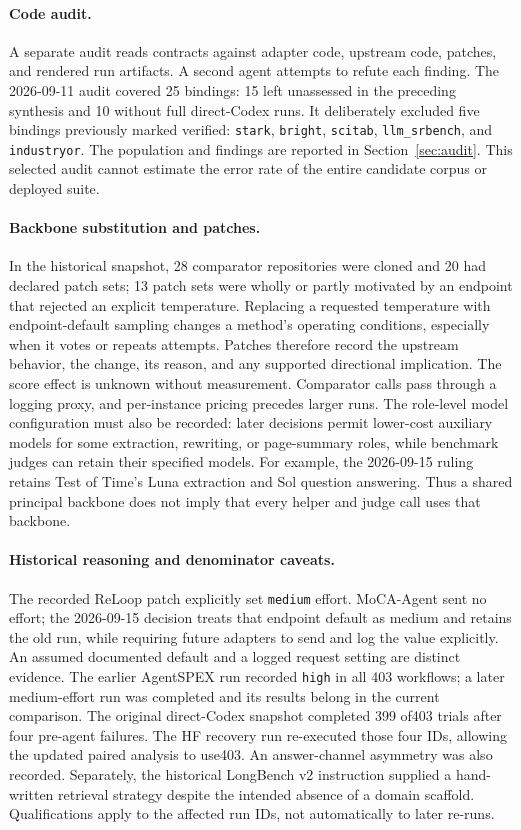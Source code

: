 \paragraph{Code audit.}
A separate audit reads contracts against adapter code, upstream code, patches, and rendered
run artifacts. A second agent attempts to refute each finding. The 2026-09-11 audit covered
25 bindings: 15 left unassessed in the preceding synthesis and 10 without full direct-Codex
runs. It deliberately excluded five bindings previously marked verified:
\texttt{stark}, \texttt{bright}, \texttt{scitab}, \texttt{llm\_srbench}, and \texttt{industryor}.
The population and findings are reported in Section~\ref{sec:audit}. This selected audit
cannot estimate the error rate of the entire candidate corpus or deployed suite.

\paragraph{Backbone substitution and patches.}
In the historical snapshot, 28 comparator repositories were cloned and 20 had declared patch
sets; 13 patch sets were wholly or partly motivated by an endpoint that rejected an explicit
temperature. Replacing a requested temperature with endpoint-default sampling changes a method's
operating conditions, especially when it votes or repeats attempts. Patches therefore record
the upstream behavior, the change, its reason, and any supported directional implication.
The score effect is unknown without measurement. Comparator calls pass through a logging proxy,
and per-instance pricing precedes larger runs. The role-level model configuration must also be
recorded: later decisions permit lower-cost auxiliary models for some extraction, rewriting, or
page-summary roles, while benchmark judges can retain their specified models. For example, the
2026-09-15 ruling retains Test of Time's Luna extraction and Sol question answering. Thus a
shared principal backbone does not imply that every helper and judge call uses that backbone.

\paragraph{Historical reasoning and denominator caveats.}
The recorded ReLoop patch explicitly set \texttt{medium} effort. MoCA-Agent sent no effort;
the 2026-09-15 decision treats that endpoint default as medium and retains the old run, while
requiring future adapters to send and log the value explicitly. An assumed documented default
and a logged request setting are distinct evidence. The earlier AgentSPEX run recorded
\texttt{high} in all 403 workflows; a later medium-effort run was completed and its results
belong in the current comparison. The original direct-Codex snapshot completed 399 of403 trials after four pre-agent failures.
The HF recovery run re-executed those four IDs, allowing the updated paired analysis to use403.
An answer-channel asymmetry was also recorded. Separately, the historical LongBench v2
instruction supplied a hand-written retrieval strategy despite the intended absence of a domain
scaffold. Qualifications apply to the affected run IDs, not automatically to later re-runs.

